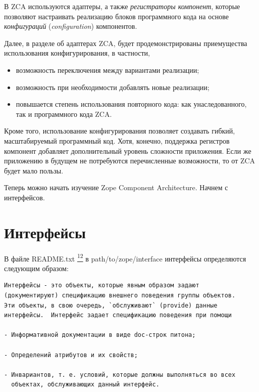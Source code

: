 \documentclass[a4paper,openany,twoside,draft]{book}
\providecommand*{\DUfootnotemark}[3]{%
  \raisebox{1em}{\hypertarget{#1}{}}%
  \hyperlink{#2}{\textsuperscript{#3}}%
}
\begin{document}
В ZCA используются адаптеры, а также \emph{регистраторы компонент}, которые позволяют настраивать реализацию блоков программного кода на основе \emph{конфигураций} (\emph{configuration}) компонентов.

Далее, в разделе об адаптерах ZCA, будет продемонстрированы приемущества использования конфигурирования, в частности,

\begin{itemize}

\item возможность переключения между вариантами реализации;

\item возможность при необходимости добавлять новые реализации;

\item повышается степень использования повторного кода: как унаследованного, так и программного кода ZCA.

\end{itemize}

Кроме того, использование конфигурирования позволяет создавать гибкий, масштабируемый программный код.  Хотя, конечно, поддержка регистров компонент добавляет дополнительный уровень сложности приложения.  Если же приложению в будущем не потребуются перечисленные возможности, то от ZCA будет мало пользы.

Теперь можно начать изучение Zope Component Architecture. Начнем с интерфейсов.


\chapter{Интерфейсы%
  \label{id23}%
}


В файле README.txt\DUfootnotemark{id25}{readmes}{12} в path/to/zope/interface интерфейсы
определяются следующим образом:

\begin{verbatim}
Интерфейсы - это объекты, которые явным образом задают
(документируют) спецификацию внешнего поведения группы объектов.
Эти объекты, в свою очередь, `обслуживают` (provide) данные
интерфейсы.  Интерфейс задает спецификацию поведения при помощи

- Информативной документации в виде doc-строк питона;

- Определений атрибутов и их свойств;

- Инвариантов, т. е. условий, которые должны выполняться во всех
  объектах, обслуживающих данный интерфейс.
\end{verbatim}
\end{document}
